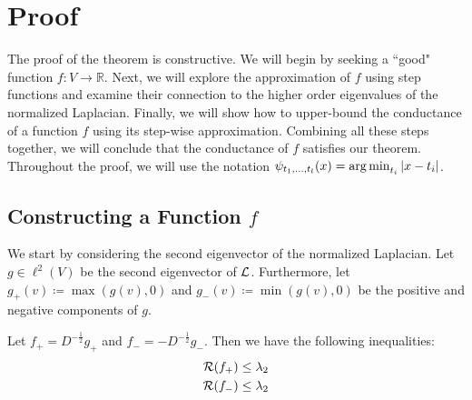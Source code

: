 \documentclass[11pt]{article}
\begin{document}
\section{Proof}

The proof of the theorem is constructive.
We will begin by seeking a ``good" function $f: V \to \mathbb{R}$. 
Next, we will explore the approximation of $f$ using step functions and examine their connection to the higher order eigenvalues of the normalized Laplacian.
Finally, we will show how to upper-bound the conductance of a function $f$ using its step-wise approximation.
Combining all these steps together, we will conclude that the conductance of $f$ satisfies our theorem. Throughout the proof, we will use the notation $\psi_{t_1,\hdots,t_l}(x) = \operatorname*{arg\,min}_{t_i}\left| x-t_i \right|$.

\subsection{Constructing a Function $f$}
We start by considering the second eigenvector of the normalized Laplacian. Let $g \in \ell^2(V)$ be the second eigenvector of $\mathcal{L}$. 
Furthermore, let $g_+(v) \coloneqq \max (g(v), 0)$ and $g_-(v) \coloneqq \min (g(v), 0)$ be the positive and negative components of $g$. 
\begin{proposition}
    Let $f_+ = D^{-\frac{1}{2}}g_+$ and $f_- = -D^{-\frac{1}{2}}g_-$. Then we have the following inequalities:
    \begin{align*}
        \mathcal{R}(f_+) &\leq \lambda_2 \\
        \mathcal{R}(f_-) &\leq \lambda_2
    \end{align*}
\end{proposition}
\end{document}
